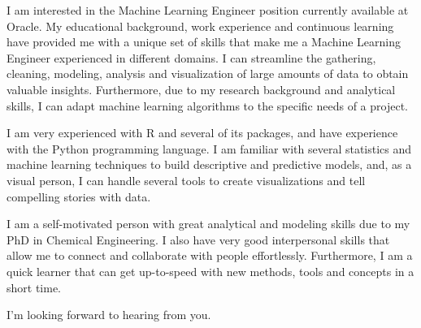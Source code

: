 \documentclass[11pt, a4paper]{awesome-cv}
\begin{document}
\makecvheader[R]


\makelettertitle

\begin{cvletter}


I am interested in the Machine Learning Engineer position currently available at Oracle. My educational background, work experience and continuous learning have provided me with a unique set of skills that make me a Machine Learning Engineer experienced in different domains. I can streamline the gathering, cleaning, modeling, analysis and visualization of large amounts of data to obtain valuable insights. Furthermore, due to my research background and analytical skills, I can adapt machine learning algorithms to the specific needs of a project.

I am very experienced with R and several of its packages, and have experience with the Python programming language. I am familiar with several statistics and machine learning techniques to build descriptive and predictive models, and, as a visual person, I can handle several tools to create visualizations and tell compelling stories with data.

I am a self-motivated person with great analytical and modeling skills due to my PhD in Chemical Engineering. I also have very good interpersonal skills that allow me to connect and collaborate with people effortlessly. Furthermore, I am a quick learner that can get up-to-speed with new methods, tools and concepts in a short time.

I'm looking forward to hearing from you.


\end{cvletter}


\makeletterclosing
\end{document}
